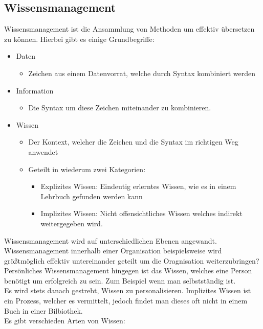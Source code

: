\documentclass{article}
\begin{document}
	\subsection{Wissensmanagement}
	Wissensmanagement ist die Ansammlung von Methoden um effektiv übersetzen zu können. Hierbei gibt es einige Grundbegriffe:
	\begin{itemize}
		\item{Daten}
		\begin{itemize}
			\item{Zeichen aus einem Datenvorrat, welche durch Syntax kombiniert werden}
		\end{itemize}
		\item{Information}
		\begin{itemize}
			\item{Die Syntax um diese Zeichen miteinander zu kombinieren.}
		\end{itemize}
		\item{Wissen}
		\begin{itemize}
			\item{Der Kontext, welcher die Zeichen und die Syntax im richtigen Weg anwendet}
			\item{Geteilt in wiederum zwei Kategorien:}
			\begin{itemize}
				\item{Explizites Wissen: Eindeutig erlerntes Wissen, wie es in einem Lehrbuch gefunden werden kann}
				\item{Implizites Wissen: Nicht offensichtliches Wissen welches indirekt weitergegeben wird.}
			\end{itemize}
		\end{itemize}
	\end{itemize}
	Wissensmanagement wird auf unterschiedlichen Ebenen angewandt. Wissensmanagement innerhalb einer Organisation beispielsweise wird größtmöglich effektiv untereinander geteilt um die Oragnisation weiterzubringen?
	Persönliches Wissensmanagement hingegen ist das Wissen, welches eine Person benötigt um erfolgreich zu sein. Zum Beispiel wenn man selbstständig ist. \\
	Es wird stets danach gestrebt, Wissen zu personalisieren. Implizites Wissen ist ein Prozess, welcher es vermittelt, jedoch findet man dieses oft nicht in einem Buch in einer Bilbiothek. \\
	Es gibt verschieden Arten von Wissen:
\end{document}
